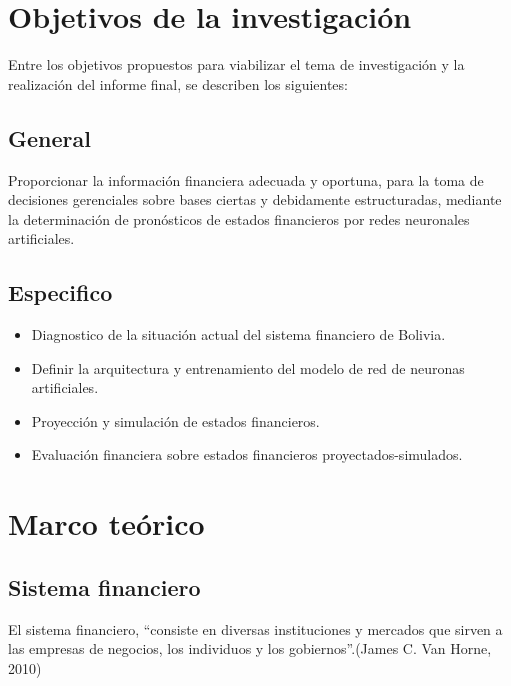 \documentclass[
  12pt,
]{article}
\providecommand{\tightlist}{%
  \setlength{\itemsep}{0pt}\setlength{\parskip}{0pt}}
\begin{document}
\hypertarget{objetivos-de-la-investigaciuxf3n}{%
\section{Objetivos de la
investigación}\label{objetivos-de-la-investigaciuxf3n}}

Entre los objetivos propuestos para viabilizar el tema de investigación
y la realización del informe final, se describen los siguientes:

\hypertarget{general}{%
\subsection{General}\label{general}}

Proporcionar la información financiera adecuada y oportuna, para la toma
de decisiones gerenciales sobre bases ciertas y debidamente
estructuradas, mediante la determinación de pronósticos de estados
financieros por redes neuronales artificiales.

\hypertarget{especifico}{%
\subsection{Especifico}\label{especifico}}

\begin{itemize}
\tightlist
\item
  Diagnostico de la situación actual del sistema financiero de Bolivia.
\item
  Definir la arquitectura y entrenamiento del modelo de red de neuronas
  artificiales.
\item
  Proyección y simulación de estados financieros.
\item
  Evaluación financiera sobre estados financieros proyectados-simulados.
\end{itemize}

\hypertarget{marco-teuxf3rico}{%
\section{Marco teórico}\label{marco-teuxf3rico}}

\hypertarget{sistema-financiero}{%
\subsection{Sistema financiero}\label{sistema-financiero}}

El sistema financiero, ``consiste en diversas instituciones y mercados
que sirven a las empresas de negocios, los individuos y los
gobiernos''.(James C. Van Horne, 2010)
\end{document}
